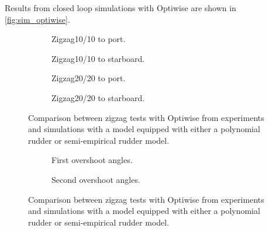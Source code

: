 Results from closed loop simulations with Optiwise are shown in \autoref{fig:sim_optiwise}. 
\begin{figure}[h]
     \centering
     \begin{subfigure}[b]{0.40\textwidth}
         \centering
         
        \caption{Zigzag10/10 to port.}
        \label{fig:sim_optiwise_10_port}
     \end{subfigure}
     \hfill
     \begin{subfigure}[b]{0.40\textwidth}
         
        \caption{Zigzag10/10 to starboard.}
        \label{fig:sim_optiwise_10_stbd}
     \end{subfigure}
     \vfill
     \begin{subfigure}[b]{0.40\textwidth}
         \centering
         
        \caption{Zigzag20/20 to port.}
        \label{fig:sim_optiwise_20_port}
     \end{subfigure}
     \hfill
     \begin{subfigure}[b]{0.40\textwidth}
         
        \caption{Zigzag20/20 to starboard.}
        \label{fig:sim_optiwise_20_stbd}
     \end{subfigure}
     
        \caption{Comparison between zigzag tests with Optiwise from experiments and simulations with a model equipped with either a polynomial rudder or semi-empirical rudder model.}
        \label{fig:sim_optiwise}
\end{figure}

\begin{figure}[h]
     \centering
     \begin{subfigure}[b]{\textwidth}
         \centering
         
        \caption{First overshoot angles.}
        \label{fig:overhoots1_optiwise}
     \end{subfigure}
     \vfill
     \begin{subfigure}[b]{\textwidth}
         \centering
         
        \caption{Second overshoot angles.}
        \label{fig:overhoots2_optiwise}
     \end{subfigure}
     
        \caption{Comparison between zigzag tests with Optiwise from experiments and simulations with a model equipped with either a polynomial rudder or semi-empirical rudder model.}
        \label{fig:sim_optiwise}
\end{figure}